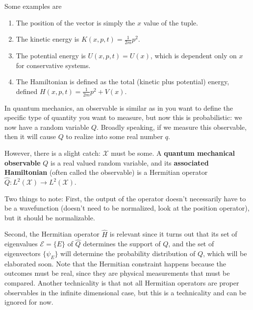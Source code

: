 \documentclass{article}
\begin{document}
  \begin{example} 
    Some examples are 
    \begin{enumerate} 
      \item The position of the vector is simply the $x$ value of the tuple. 
      \item The kinetic energy is $K(x, p, t) = \frac{1}{2m} p^2$. 
      \item The potential energy is $U(x, p, t) = U(x)$, which is dependent only on $x$ for conservative systems. 
      \item The Hamiltonian is defined as the total (kinetic plus potential) energy, defined $H(x, p, t) = \frac{1}{2m} p^2 + V(x)$. 
    \end{enumerate}
  \end{example}

  In quantum mechanics, an observable is similar as in you want to define the specific type of quantity you want to measure, but now this is probabilistic: we now have a random variable $Q$. Broadly speaking, if we measure this observable, then it will cause $Q$ to realize into some real number $q$. 

  \begin{definition}
    However, there is a slight catch: $\mathcal{X}$ must be some. A \textbf{quantum mechanical observable} $Q$ is a real valued random variable, and its \textbf{associated Hamiltonian} (often called the observable) is a Hermitian operator $\hat{Q}: L^2 (\mathcal{X}) \rightarrow L^2 (\mathcal{X})$.  
  \end{definition}

  Two things to note: First, the output of the operator doesn't necessarily have to be a wavefunction (doesn't need to be normalized, look at the position operator), but it should be normalizable. 

  Second, the Hermitian operator $\hat{H}$ is relevant since it turns out that its set of eigenvalues $\mathcal{E} = \{E\}$ of $\hat{Q}$ determines the support of $Q$, and the set of eigenvectors $\{\psi_E\}$ will determine the probability distribution of $Q$, which will be elaborated soon. Note that the Hermitian constraint happens because the outcomes must be real, since they are physical measurements that must be compared. Another technicality is that not all Hermitian operators are proper observables in the infinite dimensional case, but this is a technicality and can be ignored for now.  
\end{document}
